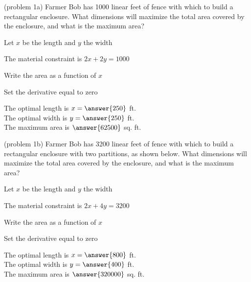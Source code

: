 \documentclass[handout]{ximera}
\begin{document}
\begin{problem}(problem 1a)
Farmer Bob has 1000 linear feet of fence with which to build a rectangular enclosure.  
What dimensions will maximize the total area covered by the enclosure, and what is the maximum area?

\begin{hint}
Let $x$ be the length and $y$ the width
\end{hint}
\begin{hint}
The material constraint is $2x+2y = 1000$
\end{hint}
\begin{hint}
Write the area as a function of $x$
\end{hint}
\begin{hint}
Set the derivative equal to zero
\end{hint}

The optimal length is $x= \answer{250}$ ft.\\
The optimal width is $y = \answer{250}$ ft.\\
The maximum area is $\answer{62500}$ sq. ft.


\end{problem}


\begin{problem}(problem 1b)
Farmer Bob has 3200 linear feet of fence with which to build a rectangular enclosure with two partitions, as shown below.
What dimensions will maximize the total area covered by the enclosure, and what is the maximum area?

\begin{center}
\end{center}
\begin{hint}
Let $x$ be the length and $y$ the width
\end{hint}
\begin{hint}
The material constraint is $2x+4y = 3200$
\end{hint}
\begin{hint}
Write the area as a function of $x$
\end{hint}
\begin{hint}
Set the derivative equal to zero
\end{hint}

The optimal length is $x= \answer{800}$ ft.\\
The optimal width is $y = \answer{400}$ ft.\\
The maximum area is $\answer{320000}$ sq. ft.
 
\end{problem}
\end{document}
